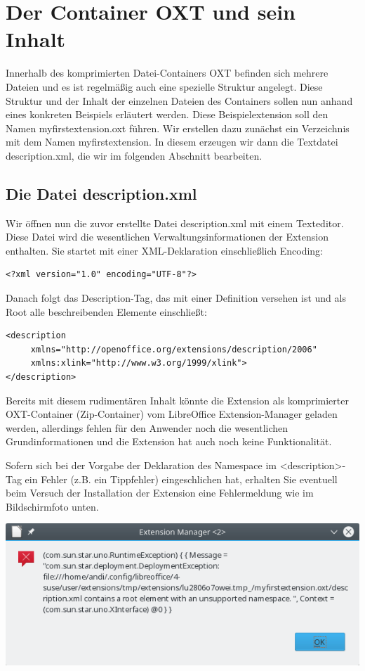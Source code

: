 \documentclass[a4paper,10pt,pagesize,titlepage]{scrbook}
\begin{document}
\chapter{Der Container OXT und sein Inhalt}
Innerhalb des komprimierten Datei-Containers OXT befinden sich mehrere Dateien und es ist regelmäßig auch eine spezielle Struktur angelegt. Diese Struktur und der Inhalt der einzelnen Dateien des Containers sollen nun anhand eines konkreten Beispiels erläutert werden. Diese Beispielextension soll den Namen myfirstextension.oxt führen. Wir erstellen dazu zunächst ein Verzeichnis mit dem Namen myfirstextension. In diesem erzeugen wir dann die Textdatei description.xml, die wir im folgenden Abschnitt bearbeiten.
\section{Die Datei description.xml}
Wir öffnen nun die zuvor erstellte Datei description.xml mit einem Texteditor. Diese Datei wird die wesentlichen Verwaltungsinformationen der Extension enthalten.
Sie startet mit einer XML-Deklaration einschließlich Encoding:
\begin{lstlisting}
<?xml version="1.0" encoding="UTF-8"?>
\end{lstlisting}
Danach folgt das Description-Tag, das mit einer Definition versehen ist und als Root alle beschreibenden Elemente einschließt:
\begin{lstlisting}
<description
     xmlns="http://openoffice.org/extensions/description/2006"
     xmlns:xlink="http://www.w3.org/1999/xlink">
</description>
\end{lstlisting}
Bereits mit diesem rudimentären Inhalt könnte die Extension als komprimierter OXT-Container (Zip-Container) vom LibreOffice Extension-Manager geladen werden, allerdings fehlen für den Anwender noch die wesentlichen Grundinformationen und die Extension hat auch noch keine Funktionalität.

Sofern sich bei der Vorgabe der Deklaration des Namespace im <description>-Tag ein Fehler (z.B. ein Tippfehler) eingeschlichen hat, erhalten Sie eventuell beim Versuch der Installation der Extension eine Fehlermeldung wie im Bildschirmfoto unten.
\begin{center}
\includegraphics[width=0.7\linewidth]{pics/error_wrong_namedeclaration}
\label{fig:error_wrong_namedeclaration}
\end{center}
\end{document}
